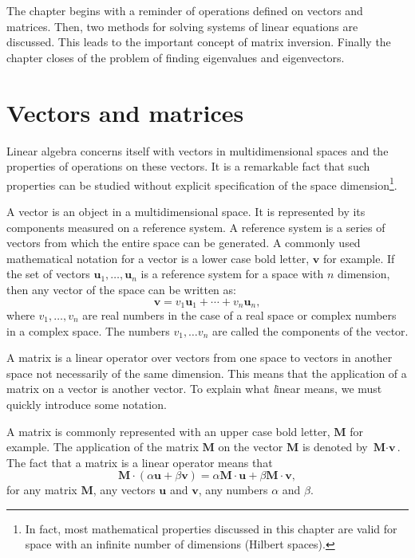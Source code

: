 The chapter begins with a reminder of operations defined on
vectors and matrices. Then, two methods for solving systems of
linear equations are discussed. This leads to the important
concept of matrix inversion. Finally the chapter closes of the
problem of finding eigenvalues and eigenvectors.

\section{Vectors and matrices}
\label{sec:linearalgebra} Linear algebra concerns itself with
vectors in multidimensional spaces and the properties of
operations on these vectors. It is a remarkable fact that such
properties can be studied without explicit specification of the
space dimension\footnote{In fact, most mathematical properties
discussed in this chapter are valid for space with an infinite
number of dimensions (Hilbert spaces).}.

A vector is an object in a multidimensional space. It is
represented by its components measured on a reference system. A
reference system is a series of vectors from which the entire
space can be generated. A commonly used mathematical notation for
a vector is a lower case bold letter, ${\textbf{v}}$ for example. If
the set of vectors ${\textbf{u}}_1,\ldots,{\textbf{u}}_n$ is a reference
system for a space with $n$ dimension, then any vector of the
space can be written as:
\begin{equation}
\label{eq:vectordef}
  {\textbf{v}} = v_1{\textbf{u}}_1+\cdots+v_n{\textbf{u}}_n,
\end{equation}
where $v_1,\ldots,v_n$ are real numbers in the case of a real
space or complex numbers in a complex space. The numbers
$v_1,\ldots v_n$ are called the components of the vector.

A matrix is a linear operator over vectors from one space to
vectors in another space not necessarily of the same dimension.
This means that the application of a matrix on a vector is another
vector. To explain what {\textsl linear} means, we must quickly
introduce some notation.

A matrix is commonly represented with an upper case bold letter,
${\textbf{M}}$ for example. The application of the matrix ${\textbf{M}}$ on
the vector ${\textbf{M}}$ is denoted by ${\textbf{M}}\cdot{\textbf{v}}$. The fact
that a matrix is a linear operator means that
\begin{equation}
{\textbf{M}}\cdot\left(\alpha{\textbf{u}}+\beta{\textbf{v}}\right)=\alpha{\textbf
{M}}\cdot{\textbf{u}}+\beta{\textbf{M}}\cdot{\textbf{v}},
\end{equation}
for any matrix ${\textbf{M}}$, any vectors ${\textbf{u}}$ and ${\textbf{v}}$, any
numbers $\alpha$ and $\beta$.

